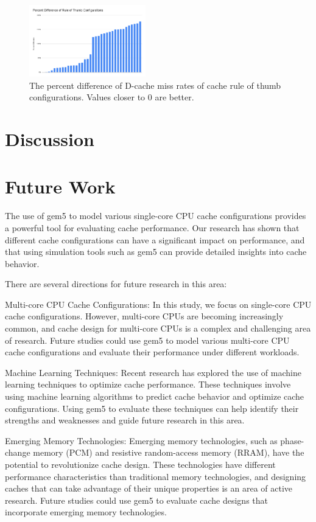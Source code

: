 \documentclass[conference]{IEEEtran}
\begin{document}
\begin{figure}[H]
  \centering
  \includegraphics[width=0.45\textwidth]{images/rijndael_percentdifference.png}
  \caption{The percent difference of D-cache miss rates of cache rule of thumb configurations. Values closer to 0 are better.}
  \label{fig:rijndael-percentdifference}
\end{figure}

\section{Discussion}


\section{Future Work}
The use of gem5 to model various single-core CPU cache configurations provides a powerful tool for evaluating cache performance. Our research has shown that different cache configurations can have a significant impact on performance, and that using simulation tools such as gem5 can provide detailed insights into cache behavior.

There are several directions for future research in this area:

Multi-core CPU Cache Configurations: In this study, we focus on single-core CPU cache configurations. However, multi-core CPUs are becoming increasingly common, and cache design for multi-core CPUs is a complex and challenging area of research. Future studies could use gem5 to model various multi-core CPU cache configurations and evaluate their performance under different workloads.

Machine Learning Techniques: Recent research has explored the use of machine learning techniques to optimize cache performance. These techniques involve using machine learning algorithms to predict cache behavior and optimize cache configurations. Using gem5 to evaluate these techniques can help identify their strengths and weaknesses and guide future research in this area.

Emerging Memory Technologies: Emerging memory technologies, such as phase-change memory (PCM) and resistive random-access memory (RRAM), have the potential to revolutionize cache design. These technologies have different performance characteristics than traditional memory technologies, and designing caches that can take advantage of their unique properties is an area of active research. Future studies could use gem5 to evaluate cache designs that incorporate emerging memory technologies.
\end{document}
